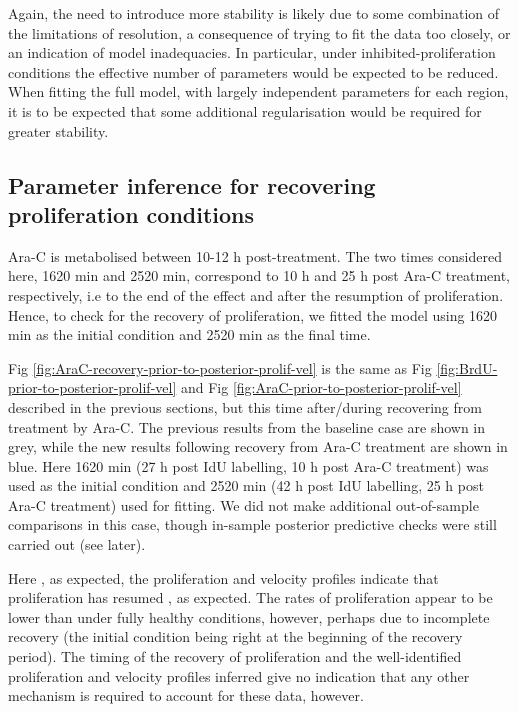 \documentclass[10pt,letterpaper]{article}
\providecommand{\DIFaddtex}[1]{{\protect\color{blue} \sf #1}} %
\providecommand{\DIFdeltex}[1]{{\protect\color{red} \scriptsize #1}} %
\providecommand{\DIFaddbegin}{} %
\providecommand{\DIFaddend}{} %
\providecommand{\DIFdelbegin}{} %
\providecommand{\DIFdelend}{} %
\providecommand{\DIFadd}[1]{\texorpdfstring{\DIFaddtex{#1}}{#1}} %
\providecommand{\DIFdel}[1]{\texorpdfstring{\DIFdeltex{#1}}{}} %
\begin{document}
Again, the need to introduce more stability is likely due to some
combination of the limitations of resolution, a consequence of trying to
fit the data too closely, or an indication of model inadequacies. In
particular, under inhibited-proliferation conditions the effective
number of parameters would be expected to be reduced. When fitting the
full model, with largely independent parameters for each region, it is
to be expected that some additional regularisation would be required for
greater stability.

\subsection{Parameter inference for recovering proliferation
conditions}\label{parameter-inference-for-recovering-proliferation-conditions}

Ara-C is metabolised between 10-12 h post-treatment. The two times
considered here, 1620 min and 2520 min, correspond to 10 h and 25 h post
Ara-C treatment, respectively, i.e to the end of the effect and after
the resumption of proliferation. Hence, to check for the recovery of
proliferation, we fitted the model using 1620 min as the initial
condition and 2520 min as the final time.

Fig \ref{fig:AraC-recovery-prior-to-posterior-prolif-vel} is the same as
Fig \ref{fig:BrdU-prior-to-posterior-prolif-vel} and Fig
\ref{fig:AraC-prior-to-posterior-prolif-vel} described in the previous
sections, but this time after/during recovering from treatment by Ara-C.
The previous results from the baseline case are shown in grey, while the
new results following recovery from Ara-C treatment are shown in blue.
Here 1620 min (27 h post IdU labelling, 10 h post Ara-C treatment) was
used as the initial condition and 2520 min (42 h post IdU labelling, 25
h post Ara-C treatment) used for fitting. We did not make additional
out-of-sample comparisons in this case, though in-sample posterior
predictive checks were still carried out (see later).

Here\DIFaddbegin \DIFadd{, as expected, }\DIFaddend the proliferation and velocity profiles indicate that
proliferation has resumed\DIFdelbegin \DIFdel{, as expected}\DIFdelend . The rates of proliferation appear to be lower
than under fully healthy conditions, however, perhaps due to incomplete
recovery (the initial condition being right at the beginning of the
recovery period). The timing of the recovery of proliferation and the
well-identified proliferation and velocity profiles inferred give no
indication that any other mechanism is required to account for these
data, however.
\end{document}
